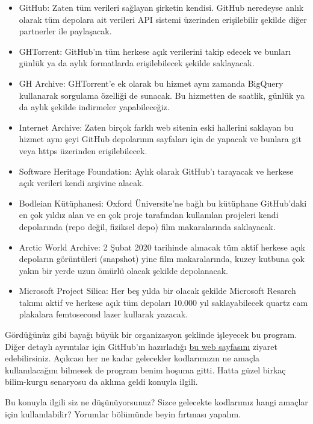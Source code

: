 \documentclass[11pt]{article}
\begin{document}
\begin{itemize}
\item GitHub: Zaten tüm verileri sağlayan şirketin kendisi. GitHub neredeyse
anlık olarak tüm depolara ait verileri API sistemi üzerinden erişilebilir
şekilde diğer partnerler ile paylaşacak.
\item GHTorrent: GitHub'ın tüm herkese açık verilerini takip edecek ve bunları
günlük ya da aylık formatlarda erişilebilecek şekilde saklayacak.
\item GH Archive: GHTorrent'e ek olarak bu hizmet aynı zamanda BigQuery
kullanarak sorgulama özelliği de sunacak. Bu hizmetten de saatlik, günlük
ya da aylık şekilde indirmeler yapabileceğiz.
\item Internet Archive: Zaten birçok farklı web sitenin eski hallerini saklayan
bu hizmet aynı şeyi GitHub depolarının sayfaları için de yapacak ve
bunlara git veya https üzerinden erişilebilecek.
\item Software Heritage Foundation: Aylık olarak GitHub'ı tarayacak ve herkese
açık verileri kendi arşivine alacak.
\item Bodleian Kütüphanesi: Oxford Üniversite'ne bağlı bu kütüphane GitHub'daki
en çok yıldız alan ve en çok proje tarafından kullanılan projeleri kendi
depolarında (repo değil, fiziksel depo) film makaralarında saklayacak.
\item Arctic World Archive: 2 Şubat 2020 tarihinde alınacak tüm aktif herkese
açık depoların görüntüleri (snapshot) yine film makaralarında, kuzey
kutbuna çok yakın bir yerde uzun ömürlü olacak şekilde depolanacak.
\item Microsoft Project Silica: Her beş yılda bir olacak şekilde Microsoft
Resarch takımı aktif ve herkese açık tüm depoları 10.000 yıl
saklayabilecek quartz cam plakalara femtosecond lazer kullarak yazacak.
\end{itemize}

Gördüğünüz gibi bayağı büyük bir organizasyon şeklinde işleyecek bu program.
Diğer detaylı ayrıntılar için GitHub'ın hazırladığı \href{https://archiveprogram.github.com/}{bu web sayfasını} ziyaret
edebilirsiniz. Açıkcası her ne kadar gelecekler kodlarımızın ne amaçla
kullanılacağını bilmesek de program benim hoşuma gitti. Hatta güzel birkaç
bilim-kurgu senaryosu da aklıma geldi konuyla ilgili.

Bu konuyla ilgili siz ne düşünüyorsunuz? Sizce gelecekte kodlarımız hangi
amaçlar için kullanılabilir? Yorumlar bölümünde beyin fırtınası yapalım.
\end{document}
